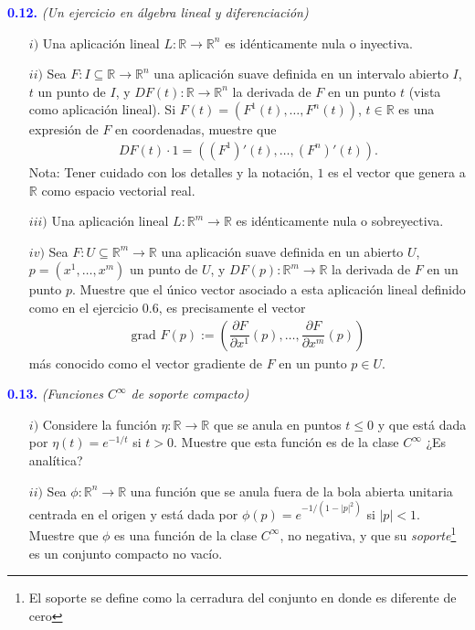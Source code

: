 \documentclass[oneside,11pt]{memoir}
\begin{document}
\textcolor{blue}{\textbf{0.12.}} \textit{(Un ejercicio en álgebra lineal y diferenciación)}
\begin{enumerate}
    \item[$i)$] Una aplicación lineal $L:\mathbb{R}\to\mathbb{R}^n$ es idénticamente nula o inyectiva.
    \item[$ii)$] Sea $F:I\subseteq \mathbb{R}\to\mathbb{R}^n$ una aplicación suave definida en un intervalo abierto $I$, $t$ un punto de $I$, y $DF(t):\mathbb{R}\to\mathbb{R}^n$ la derivada de $F$ en un punto $t$ (vista como aplicación lineal). Si $F(t)=(F^1(t),\ldots,F^n(t))$, $t\in \mathbb{R}$ es una expresión de $F$ en coordenadas, muestre que
    \begin{align*}
        DF(t)\cdot 1 =((F^1)'(t),\ldots,(F^n)'(t)).
    \end{align*}
    Nota: Tener cuidado con los detalles y la notación, $1$ es el vector que genera a $\mathbb{R}$ como espacio vectorial real.
    \item[$iii)$] Una aplicación lineal $L:\mathbb{R}^m\to\mathbb{R}$ es idénticamente nula o sobreyectiva.
    \item[$iv)$] Sea $F:U\subseteq \mathbb{R}^m\to \mathbb{R}$ una aplicación suave definida en un abierto $U$, $p=(x^1,\ldots,x^m)$ un punto de $U$, y $DF(p):\mathbb{R}^m\to \mathbb{R}$ la derivada de $F$ en un punto $p$. Muestre que el único vector asociado a esta aplicación lineal definido como en el ejercicio 0.6, es precisamente el vector
    \begin{align*}
        \text{grad }F(p):=\left(\dfrac{\partial F}{\partial x^1}(p),\ldots,\dfrac{\partial F}{\partial x^m}(p)\right) 
    \end{align*}
    más conocido como el vector gradiente de $F$ en un punto $p\in U$.
\end{enumerate}
\textcolor{blue}{\textbf{0.13.}} \textit{(Funciones $C^\infty$ de soporte compacto)}
\begin{enumerate}
    \item[$i)$] Considere la función $\eta:\mathbb{R}\to \mathbb{R}$ que se anula en puntos $t\leq 0$ y que está dada por $\eta(t)=e^{-1/t}$ si $t>0$. Muestre que esta función es de la clase $C^\infty$ ¿Es analítica?
    \item[$ii)$] Sea $\phi:\mathbb{R}^n\to \mathbb{R}$ una función que se anula fuera de la bola abierta unitaria centrada en el origen y está dada por $\phi(p)=e^{-1/(1-|p|^2)}$ si $|p|<1$. Muestre que $\phi$ es una función de la clase $C^\infty$, no negativa, y que su \textit{soporte}\footnote{El soporte se define como la cerradura del conjunto en donde es diferente de cero} es un conjunto compacto no vacío.
\end{enumerate}
\end{document}
